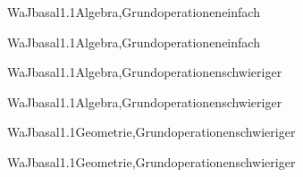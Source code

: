 \documentclass[12pt]{article}
\begin{document}
    \begin{Add}{WaJ}{basal1.1}{Algebra,Grundoperationen}{einfach}
    \solution{ }
    \end{Add}
    \begin{Add}{WaJ}{basal1.1}{Algebra,Grundoperationen}{einfach}
    \end{Add}
    

\begin{Add}{WaJ}{basal1.1}{Algebra,Grundoperationen}{schwieriger}
\solution{ }
\end{Add}
\begin{Add}{WaJ}{basal1.1}{Algebra,Grundoperationen}{schwieriger}
\end{Add}

    \begin{Add}{WaJ}{basal1.1}{Geometrie,Grundoperationen}{schwieriger}
    \solution{ }
    \end{Add}
    \begin{Add}{WaJ}{basal1.1}{Geometrie,Grundoperationen}{schwieriger}
    \end{Add}
    
\end{document}
